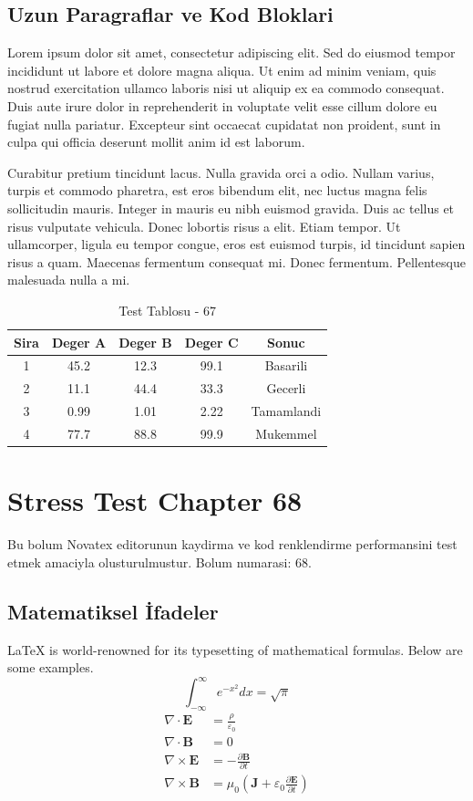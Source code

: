 \documentclass[12pt,a4paper]{article}
\begin{document}
\subsection{Uzun Paragraflar ve Kod Bloklari}
Lorem ipsum dolor sit amet, consectetur adipiscing elit. Sed do eiusmod tempor incididunt ut labore et dolore magna aliqua. Ut enim ad minim veniam, quis nostrud exercitation ullamco laboris nisi ut aliquip ex ea commodo consequat. Duis aute irure dolor in reprehenderit in voluptate velit esse cillum dolore eu fugiat nulla pariatur. Excepteur sint occaecat cupidatat non proident, sunt in culpa qui officia deserunt mollit anim id est laborum.

Curabitur pretium tincidunt lacus. Nulla gravida orci a odio. Nullam varius, turpis et commodo pharetra, est eros bibendum elit, nec luctus magna felis sollicitudin mauris. Integer in mauris eu nibh euismod gravida. Duis ac tellus et risus vulputate vehicula. Donec lobortis risus a elit. Etiam tempor. Ut ullamcorper, ligula eu tempor congue, eros est euismod turpis, id tincidunt sapien risus a quam. Maecenas fermentum consequat mi. Donec fermentum. Pellentesque malesuada nulla a mi.

\begin{table}[h!]
\centering
\begin{tabular}{|c|c|c|c|c|}
\hline
\textbf{Sira} & \textbf{Deger A} & \textbf{Deger B} & \textbf{Deger C} & \textbf{Sonuc} \\
\hline
1 & 45.2 & 12.3 & 99.1 & Basarili \\
2 & 11.1 & 44.4 & 33.3 & Gecerli \\
3 & 0.99 & 1.01 & 2.22 & Tamamlandi \\
4 & 77.7 & 88.8 & 99.9 & Mukemmel \\
\hline
\end{tabular}
\caption{Test Tablosu - 67}
\end{table}

\newpage
\section{Stress Test Chapter 68}
Bu bolum Novatex editorunun kaydirma ve kod renklendirme performansini test etmek amaciyla olusturulmustur. Bolum numarasi: 68.

\subsection{Matematiksel İfadeler}
\LaTeX{} is world-renowned for its typesetting of mathematical formulas. Below are some examples.
\begin{equation}
\int_{-\infty}^{\infty} e^{-x^2} dx = \sqrt{\pi}
\end{equation}
\begin{align}
\nabla \cdot \mathbf{E} &= \frac{\rho}{\varepsilon_0} \\
\nabla \cdot \mathbf{B} &= 0 \\
\nabla \times \mathbf{E} &= -\frac{\partial \mathbf{B}}{\partial t} \\
\nabla \times \mathbf{B} &= \mu_0\left(\mathbf{J} + \varepsilon_0 \frac{\partial \mathbf{E}}{\partial t}\right)
\end{align}
\end{document}
